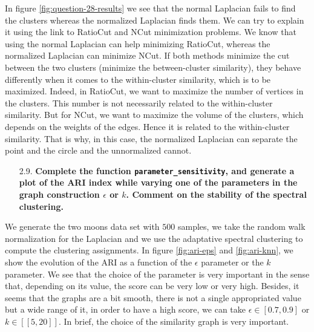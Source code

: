 \documentclass[a4paper, 11pt]{article}
\begin{document}
    In figure \ref{fig:question-28-results} we see that the normal Laplacian fails to find the clusters whereas the normalized Laplacian finds them. We can try to explain it using the link to RatioCut and NCut minimization problems. We know that using the normal Laplacian can help minimizing RatioCut, whereas the normalized Laplacian can minimize NCut. If both methods minimize the cut between the two clusters (\ie minimize the between-cluster similarity), they behave differently when it comes to the within-cluster similarity, which is to be maximized. Indeed, in RatioCut, we want to maximize the number of vertices in the clusters. This number is not necessarily related to the within-cluster similarity. But for NCut, we want to maximize the volume of the clusters, which depends on the weights of the edges. Hence it is related to the within-cluster similarity. That is why, in this case, the normalized Laplacian can separate the point and the circle and the unnormalized cannot.

\begin{itemize}
    \item[2.9.] \textbf{Complete the function \texttt{parameter\_sensitivity}, and generate a plot of the ARI index while varying one of the parameters in the graph construction $\epsilon$ or $k$. Comment on the stability of the spectral clustering.}
\end{itemize}

    We generate the two moons data set with $500$ samples, we take the random walk normalization for the Laplacian and we use the adaptative spectral clustering to compute the clustering assignments. In figure \ref{fig:ari-eps} and \ref{fig:ari-knn}, we show the evolution of the ARI as a function of the $\epsilon$ parameter or the $k$ parameter. We see that the choice of the parameter is very important in the sense that, depending on its value, the score can be very low or very high. Besides, it seems that the graphs are a bit smooth, \ie there is not a single appropriated value but a wide range of it, \eg in order to have a high score, we can take $\epsilon \in [0.7, 0.9]$ or $k \in [\![ 5, 20 ]\!]$. In brief, the choice of the similarity graph is very important.
\end{document}
